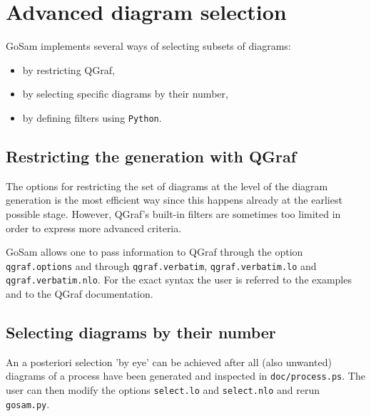 \documentclass[11pt,a4paper]{refrep}
\newcommand{\gosamversion}{{2{.}0}}
\newcommand{\gosamv}[1][\gosamversion]{{\sc GoSam}\xspace}
\newcommand{\python}{{\tt Python}\xspace}
\begin{document}

\chapter{Advanced diagram selection}
\gosamv implements several ways of selecting subsets of diagrams:
\begin{itemize}
\item by restricting QGraf,
\item by selecting specific diagrams by their number,
\item by defining filters using \python.
\end{itemize}

\section{Restricting the generation with QGraf}
The options for restricting the set of diagrams at the level
of the diagram generation is the most efficient way since this
happens already at the earliest possible stage.
However, QGraf's built-in filters are sometimes
too limited in order to express more advanced criteria.

\gosamv{} allows one to pass information to QGraf through the option
\texttt{qgraf.options} and through \texttt{qgraf.verbatim},
\texttt{qgraf.verbatim.lo} and \texttt{qgraf.verbatim.nlo}.
For the exact syntax the user is referred to the examples and 
to the QGraf documentation.

\section{Selecting diagrams by their number}
An a posteriori selection 'by eye' can be achieved after all (also unwanted)
diagrams of a process have been generated and inspected in
\texttt{doc/process.ps}. The user can then modify the options
\texttt{select.lo} and \texttt{select.nlo} and rerun \texttt{gosam.py}.
\end{document}
